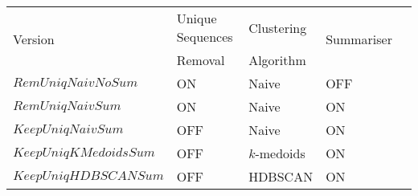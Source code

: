 \begin{tabular}{lllll}
\toprule
\multirow{2}{*}[3pt]{Version} & Unique Sequences & Clustering & \multirow{2}{*}[3pt]{Summariser} \\[-5pt]
& Removal & Algorithm & \\
\midrule
$RemUniqNaivNoSum$ & ON & Naive & OFF \\
$RemUniqNaivSum$ & ON & Naive & ON \\
$KeepUniqNaivSum$ & OFF & Naive & ON \\
$KeepUniqKMedoidsSum$ & OFF & $k$-medoids & ON \\
$KeepUniqHDBSCANSum$ & OFF & HDBSCAN & ON \\
\bottomrule
\end{tabular}